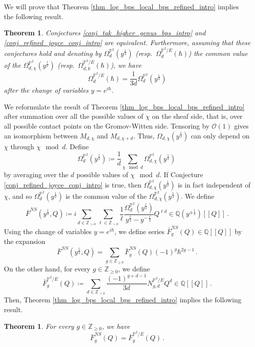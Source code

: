 \documentclass[11pt,letterpaper]{amsart}
\newtheorem{thm}[defn]{Theorem}
\newcommand\PP{\mathbb P}
\newcommand\Q{\mathbb Q}
\newcommand\Z{\mathbb Z}
\newcommand\cO{\mathcal O}
\begin{document}
We will prove that Theorem \ref{thm_log_bps_local_bps_refined_intro} implies the following result.

\begin{thm}\label{thm_equiv_conj_intro}
Conjectures \ref{conj_tak_higher_genus_bps_intro} and \ref{conj_refined_joyce_conj_intro} are equivalent. Furthermore, assuming that these conjectures hold and denoting by 
$\Omega_d^{\PP^2}(y^{\frac{1}{2}})$
(resp.\ $\Omega_d^{\PP^2/E}(\hbar)$)
the common value of the $\Omega_{d,\chi}^{\PP^2}(y^{\frac{1}{2}})$
(resp.\ $\Omega_{d,k}^{\PP^2/E}(\hbar)$), we have
\[ \Omega_d^{\PP^2/E}(\hbar)
=\frac{1}{3d} \Omega_d^{\PP^2}(y^{\frac{1}{2}}) \]
after the change of variables $y=e^{i\hbar}$.
\end{thm}

We reformulate the result of Theorem \ref{thm_log_bps_local_bps_refined_intro}
after summation over all the possible values of $\chi$ on the sheaf side, that is, over all possible contact points on the Gromov-Witten side.
Tensoring by $\cO(1)$ gives an isomorphism between 
$M_{d,\chi}$ and $M_{d,\chi+d}$. Thus, $\Omega_{d,\chi}(y^{\frac{1}{2}})$ can only depend on $\chi$
through $\chi\!\!\!\!\mod d$. 
Define 
\[ \Omega_d^{\PP^2}(y^{\frac{1}{2}})
\coloneq \frac{1}{d} \sum_{\chi\!\!\!\!\mod d} \Omega_{d,\chi}^{\PP^2}(y^{\frac{1}{2}})\,\]
by averaging over the $d$ possible values of 
$\chi\!\!\!\mod d$.
If Conjecture \ref{conj_refined_joyce_conj_intro} is true, then $\Omega_{d,\chi}^{\PP^2}(y^{\frac{1}{2}})$ is in fact independent of $\chi$, and so $\Omega_d^{\PP^2}(y^{\frac{1}{2}})$ is the common value of the $\Omega_{d,\chi}^{\PP^2}(y^{\frac{1}{2}})$.
We define 
\[ \bar{F}^{NS}(y^{\frac{1}{2}},Q) 
\coloneq i \sum_{d \in \Z_{>0}}
\sum_{\ell \in \Z_{>0}} \frac{1}{\ell} \frac{\Omega_d^{\PP^2}(y^{\frac{\ell}{2}})}{
y^{\frac{\ell}{2}}-y^{-\frac{\ell}{2}}} Q^{\ell d} \in \Q(y^{\pm \frac{1}{2}})[\![Q]\!]\,.\]
Using the change of variables $y=e^{i \hbar}$, we define series $\bar{F}_g^{NS}(Q) \in \Q[\![Q]\!]$ by the expansion
\[ \bar{F}^{NS}(y^{\frac{1}{2}},Q) =\sum_{g \in \Z_{\geqslant 0}} \bar{F}_g^{NS} (Q) 
(-1)^g \hbar^{2g-1}\,.\]
On the other hand, for every $g \in \Z_{\geqslant 0}$, we define
\[ \bar{F}_g^{\PP^2/E} (Q) 
\coloneq \sum_{d \in \Z_{>0}}
\frac{(-1)^{g+d-1}}{3d} N_{g,d}^{\PP^2/E} Q^d \in \Q[\![Q]\!]\,.\]
Then, Theorem \ref{thm_log_bps_local_bps_refined_intro}
implies the following result.

\begin{thm} \label{thm_NS_intro}
For every $g \in \Z_{\geqslant 0}$, we have 
\[  \bar{F}^{NS}_g(Q) =\bar{F}_g^{\PP^2/E} (Q) \,.\]
\end{thm}
\end{document}
